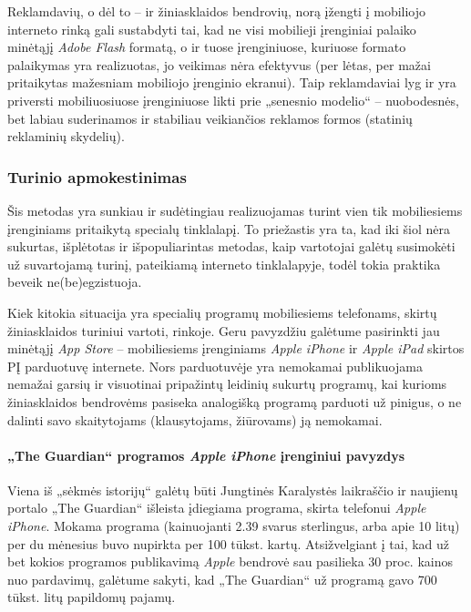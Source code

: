 \documentclass[kursinis-darbas]{vukf}
\begin{document}
Reklamdavių, o dėl to – ir žiniasklaidos bendrovių, norą įžengti į mobiliojo interneto rinką gali sustabdyti tai, kad ne visi mobilieji įrenginiai palaiko minėtąjį \emph{Adobe Flash} formatą, o ir tuose įrenginiuose, kuriuose formato palaikymas yra realizuotas, jo veikimas nėra efektyvus (per lėtas, per mažai pritaikytas mažesniam mobiliojo įrenginio ekranui). Taip reklamdaviai lyg ir yra priversti mobiliuosiuose įrenginiuose likti prie „senesnio modelio“ – nuobodesnės, bet labiau suderinamos ir stabiliau veikiančios reklamos formos (statinių reklaminių skydelių).


\subsubsection{Turinio apmokestinimas}

Šis metodas yra sunkiau ir sudėtingiau realizuojamas turint vien tik mobiliesiems įrenginiams pritaikytą specialų tinklalapį. To priežastis yra ta, kad iki šiol nėra sukurtas, išplėtotas ir išpopuliarintas metodas, kaip vartotojai galėtų susimokėti už suvartojamą turinį, pateikiamą interneto tinklalapyje, todėl tokia praktika beveik ne(be)egzistuoja.

Kiek kitokia situacija yra specialių programų mobiliesiems telefonams, skirtų žiniasklaidos turiniui vartoti, rinkoje. Geru pavyzdžiu galėtume pasirinkti jau minėtąjį \emph{App Store} – mobiliesiems įrenginiams \emph{Apple iPhone} ir \emph{Apple iPad} skirtos PĮ parduotuvę internete. Nors parduotuvėje yra nemokamai publikuojama nemažai garsių ir visuotinai pripažintų leidinių sukurtų programų, kai kurioms žiniasklaidos bendrovėms pasiseka analogišką programą parduoti už pinigus, o ne dalinti savo skaitytojams (klausytojams, žiūrovams) ją nemokamai.

\paragraph{„The Guardian“ programos \emph{Apple iPhone} įrenginiui pavyzdys}

Viena iš „sėkmės istorijų“ galėtų būti Jungtinės Karalystės laikraščio ir naujienų portalo „The Guardian“ išleista įdiegiama programa, skirta telefonui \emph{Apple iPhone}. Mokama programa (kainuojanti 2.39 svarus sterlingus, arba apie 10 litų) per du mėnesius buvo nupirkta per 100 tūkst. kartų. \cite{guardian_more_than_100k_downloads_of_guardian_iphone_app} Atsižvelgiant į tai, kad už bet kokios programos publikavimą \emph{Apple} bendrovė sau pasilieka 30 proc. kainos nuo pardavimų, galėtume sakyti, kad „The Guardian“ už programą gavo 700 tūkst. litų papildomų pajamų.
\end{document}

